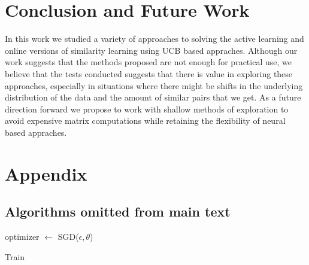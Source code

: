 \documentclass{article}
\begin{document}
\section{Conclusion and Future Work}
In this work we studied a variety of approaches to solving the active learning and online versions of similarity learning using UCB based appraches.
Although our work suggests that the methods proposed are not enough for practical use, we believe that the tests conducted suggests that there is
value in exploring these approaches, especially in situations where there might be shifts in the underlying distribution of the data and the
amount of similar pairs that we get.
As a future direction forward we propose to work with shallow methods of exploration to avoid expensive matrix computations while
retaining the flexibility of neural based appraches.




\newpage
\appendix
\section{Appendix}

\subsection{Algorithms omitted from main text}

\begin{algorithm}

    optimizer $\gets$ SGD($\epsilon, \theta$)\;
    \caption{Train}\label{algo:train}
  \end{algorithm}
\end{document}
